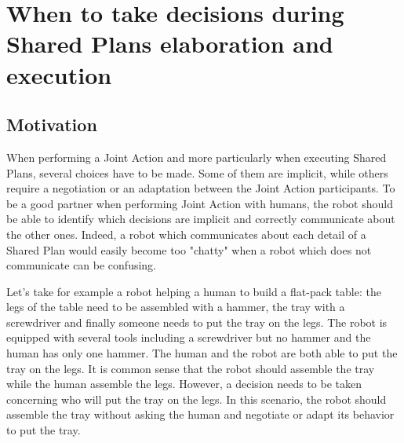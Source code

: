 \documentclass[english,a4paper,11pt,twoside]{StyleThese}
\begin{document}
\setcounter{chapter}{3} %
\dominitoc
\faketableofcontents
\fi

\chapter{When to take decisions during Shared Plans elaboration and execution}
\minitoc

\label{ch:SP}

\section{Motivation}

When performing a Joint Action and more particularly when executing Shared Plans, several choices have to be made. Some of them are implicit, while others require a negotiation or an adaptation between the Joint Action participants. To be a good partner when performing Joint Action with humans, the robot should be able to identify which decisions are implicit and correctly communicate about the other ones. Indeed, a robot which communicates about each detail of a Shared Plan would easily become too "chatty" when a robot which does not communicate can be confusing.

Let's take for example a robot helping a human to build a flat-pack table: the legs of the table need to be assembled with a hammer, the tray with a screwdriver and finally someone needs to put the tray on the legs. The robot is equipped with several tools including a screwdriver but no hammer and the human has only one hammer. The human and the robot are both able to put the tray on the legs. It is common sense that the robot should assemble the tray while the human assemble the legs. However, a decision needs to be taken concerning who will put the tray on the legs. 
In this scenario, the robot should assemble the tray without asking the human and negotiate or adapt its behavior to put the tray. 
\end{document}
